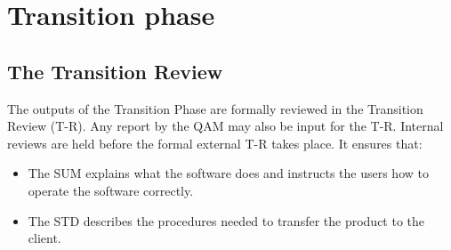 \chapter{Transition phase} \label{chap:transitionPhase}
\section{The Transition Review}

The outputs of the Transition Phase are formally reviewed in the Transition Review (T-R). Any report by the QAM may also be input for the T-R. Internal reviews are held  before the formal external T-R takes place. It ensures that:
\begin{itemize}
\item The SUM explains what the software does and instructs the users how to operate the software correctly.
\item The STD describes the procedures needed to transfer the product to the client.
\end{itemize}
